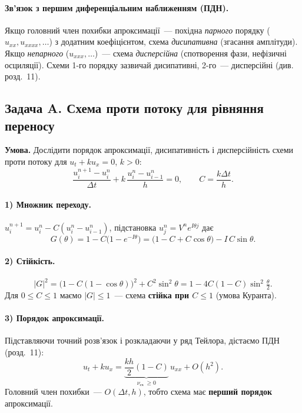 \documentclass[12pt,a4paper]{article}
\theoremstyle{definition}
\theoremstyle{plain}
\newcommand{\abs}[1]{\left\lvert #1 \right\rvert}
\begin{document}
\paragraph{Зв'язок з першим диференціальним наближенням (ПДН).} Якщо
головний член похибки апроксимації~--- похідна \emph{парного} порядку
($u_{xx},u_{xxxx},\dots$) з додатним коефіцієнтом, схема
\emph{дисипативна} (згасання амплітуди). Якщо \emph{непарного}
($u_{xxx},\dots$)~--- схема \emph{дисперсійна} (спотворення фази,
нефізичні осциляції). Схеми 1-го порядку зазвичай дисипативні, 2-го~---
дисперсійні (див. розд.~11).

\subsection{Задача A. Схема проти потоку для рівняння переносу}
\textbf{Умова.} Дослідити порядок апроксимації, дисипативність і
дисперсійність схеми проти потоку для $u_t+k u_x=0$, $k>0$:
\[
  \frac{u_i^{n+1}-u_i^n}{\Delta t}+k\,\frac{u_i^n-u_{i-1}^n}{h}=0,
  \qquad C=\frac{k\Delta t}{h}.
\]

\paragraph{1) Множник переходу.} $u_i^{n+1}=u_i^n-C(u_i^n-u_{i-1}^n)$,
підстановка $u_j^n=V^n e^{I\theta j}$ дає
\begin{equation}
  G(\theta)=1-C\big(1-e^{-I\theta}\big)
   =\big(1-C+C\cos\theta\big)-I\,C\sin\theta .
\end{equation}

\paragraph{2) Стійкість.} 
\begin{equation}
  \abs{G}^2=\big(1-C(1-\cos\theta)\big)^2+C^2\sin^2\theta
   =1-4C(1-C)\sin^2\tfrac{\theta}{2}.
\end{equation}
Для $0\le C\le1$ маємо $\abs{G}\le1$~--- схема \textbf{стійка при $C\le1$}
(умова Куранта).

\paragraph{3) Порядок апроксимації.} Підставляючи точний розв'язок і
розкладаючи у ряд Тейлора, дістаємо ПДН (розд.~11):
\begin{equation}
  u_t+k u_x=\underbrace{\frac{kh}{2}(1-C)}_{\nu_{\text{сх}}\ \ge 0}\,u_{xx}+O(h^2).
\end{equation}
Головний член похибки~--- $O(\Delta t,h)$, тобто схема має
\textbf{перший порядок} апроксимації.
\end{document}
